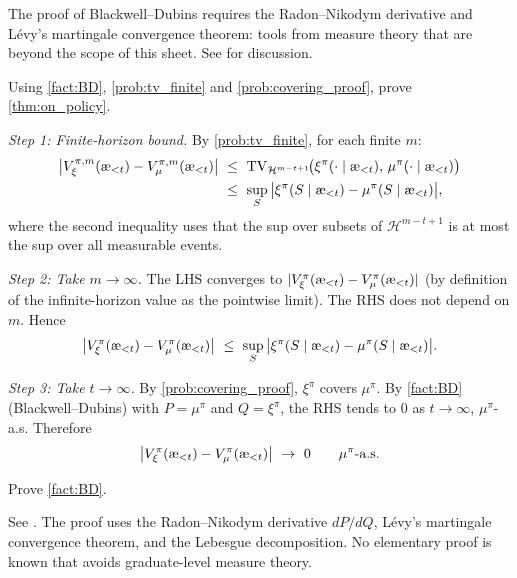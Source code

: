\documentclass[fontsize=11pt, parskip=half]{scrartcl}
\newcommand{\cH}{\mathcal{H}}
\newcommand{\TV}[1][]{\mathrm{TV}_{#1}}
\newcommand{\aes}{\textnormal{\ae}}
\begin{document}
The proof of Blackwell--Dubins requires the Radon--Nikodym derivative and L\'{e}vy's martingale convergence theorem: tools from measure theory that are beyond the scope of this sheet.
See \cite[Chapter~3.9]{Hutter:24uaibook2} for discussion.

\begin{exercise}
\label{prob:on_policy_proof}
Using \cref{fact:BD}, \cref{prob:tv_finite} and \cref{prob:covering_proof}, prove \cref{thm:on_policy}.

\end{exercise}

\begin{solution}
\emph{Step 1: Finite-horizon bound.}
By \cref{prob:tv_finite}, for each finite $m$:
\begin{align*}
    \big|V_\xi^{\pi,m}(\aes_{<t}) - V_\mu^{\pi,m}(\aes_{<t})\big|
    ~&\leq~ \TV[\cH^{m-t+1}]\!\big(\xi^\pi(\cdot \mid \aes_{<t}),\, \mu^\pi(\cdot \mid \aes_{<t})\big) \\
    ~&\leq~ \sup_S \big|\xi^\pi(S \mid \aes_{<t}) - \mu^\pi(S \mid \aes_{<t})\big|,
\end{align*}
where the second inequality uses that the sup over subsets of $\cH^{m-t+1}$ is at most the sup over all measurable events.

\emph{Step 2: Take $m \to \infty$.}
The LHS converges to $|V_\xi^\pi(\aes_{<t}) - V_\mu^\pi(\aes_{<t})|$ (by definition of the infinite-horizon value as the pointwise limit). The RHS does not depend on $m$. Hence
\[
    \big|V_\xi^\pi(\aes_{<t}) - V_\mu^\pi(\aes_{<t})\big|
    ~\leq~ \sup_S \big|\xi^\pi(S \mid \aes_{<t}) - \mu^\pi(S \mid \aes_{<t})\big|.
\]

\emph{Step 3: Take $t \to \infty$.}
By \cref{prob:covering_proof}, $\xi^\pi$ covers $\mu^\pi$. By \cref{fact:BD} (Blackwell--Dubins) with $P = \mu^\pi$ and $Q = \xi^\pi$, the RHS tends to $0$ as $t \to \infty$, $\mu^\pi$-a.s. Therefore
\[
    \big|V_\xi^\pi(\aes_{<t}) - V_\mu^\pi(\aes_{<t})\big| ~\to~ 0 \qquad \mu^\pi\text{-a.s.}
\]
\end{solution}

\begin{exercise}
\label{prob:auto4}
\skippable
Prove \cref{fact:BD}.


\begin{hint}
See \cite{Blackwell:62}. The proof uses the Radon--Nikodym derivative $dP/dQ$, L\'{e}vy's martingale convergence theorem, and the Lebesgue decomposition.
No elementary proof is known that avoids graduate-level measure theory.
\end{hint}


\end{exercise}
\end{document}
